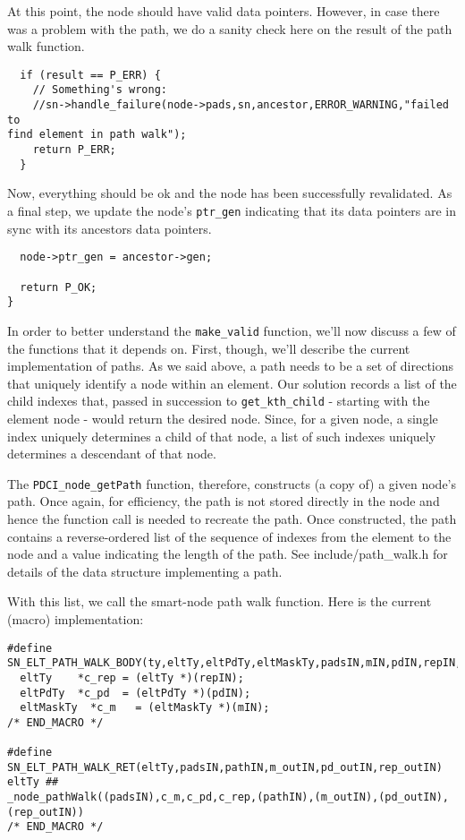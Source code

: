 \documentclass{article}
\begin{document}
At this point, the node should have valid data pointers. However, in 
case there was a problem with the path, we do a sanity check here on the 
result of the path walk function.

\begin{verbatim}
  if (result == P_ERR) {
    // Something's wrong:
    //sn->handle_failure(node->pads,sn,ancestor,ERROR_WARNING,"failed to 
find element in path walk");
    return P_ERR;
  }
\end{verbatim}

Now, everything should be ok and the node has been successfully 
revalidated. As a final step, we update the node's \verb+ptr_gen+ indicating 
that its data pointers are in sync with its ancestors data pointers.

\begin{verbatim}
  node->ptr_gen = ancestor->gen;

  return P_OK;
}
\end{verbatim}

In order to better understand the \verb+make_valid+ function, we'll now
discuss a few of the functions that it depends on. First, though,
we'll describe the current implementation of paths. As we said above,
a path needs to be a set of directions that uniquely identify a node
within an element. Our solution records a list of the child indexes
that, passed in succession to \verb+get_kth_child+ - starting with the
element node - would return the desired node. Since, for a given node,
a single index uniquely determines a child of that node, a list of
such indexes uniquely determines a descendant of that node.

  The \verb+PDCI_node_getPath+ function, therefore, constructs (a copy of) a 
given node's path. Once again, for efficiency, the path is not stored 
directly in the node and hence the function call is needed to recreate 
the path. Once constructed, the path contains a reverse-ordered list of 
the sequence of indexes from the element to the node and a value 
indicating the length of the path. See include/path\_walk.h for details 
of the data structure implementing a path.

  With this list, we call the smart-node path walk function. Here is the 
current (macro) implementation:

\begin{verbatim}
#define 
SN_ELT_PATH_WALK_BODY(ty,eltTy,eltPdTy,eltMaskTy,padsIN,mIN,pdIN,repIN,pathIN,m_outIN,pd_outIN,rep_outIN)
  eltTy    *c_rep = (eltTy *)(repIN);
  eltPdTy  *c_pd  = (eltPdTy *)(pdIN);
  eltMaskTy  *c_m   = (eltMaskTy *)(mIN);
/* END_MACRO */

#define SN_ELT_PATH_WALK_RET(eltTy,padsIN,pathIN,m_outIN,pd_outIN,rep_outIN)
eltTy ## 
_node_pathWalk((padsIN),c_m,c_pd,c_rep,(pathIN),(m_outIN),(pd_outIN),(rep_outIN))
/* END_MACRO */
\end{verbatim}
\end{document}

